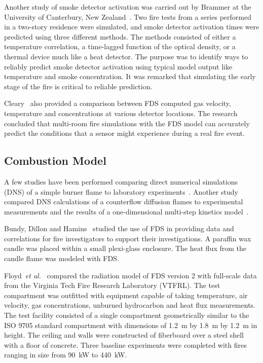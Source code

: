 Another study of smoke detector activation was carried out by Brammer at the University of Canterbury, New Zealand~\cite{Brammer:1}. Two fire tests from a series performed in a two-story residence were simulated, and smoke detector activation times were predicted using three different methods. The methods consisted of either a temperature correlation, a time-lagged function of the optical density, or a thermal device much like a heat detector. The purpose was to identify ways to reliably predict smoke detector activation using typical model output like temperature and smoke concentration. It was remarked that simulating the early stage of the fire is critical to reliable prediction.

Cleary~\cite{Cleary:1} also provided a comparison between FDS computed gas velocity, temperature and concentrations at various detector locations.  The research concluded that multi-room fire simulations with the FDS model can accurately predict the conditions that a sensor might experience during a real fire event.




\subsection{Combustion Model}

A few studies have been performed comparing direct numerical simulations (DNS) of a simple burner flame to laboratory experiments~\cite{Mukhopadhyay:1}. Another study compared DNS calculations of a counterflow diffusion flames to experimental measurements and the results of a one-dimensional multi-step kinetics model~\cite{Hamins:NASA}.

Bundy, Dillon and Hamins~\cite{Dillon:1,Hamins:FPE2005} studied the use of FDS in providing data and correlations for fire investigators to support their investigations.  A paraffin wax candle was placed within a small plexi-glass enclosure. The heat flux from the candle flame was modeled with FDS.

Floyd~{\em et al.}~\cite{Floyd:1,Floyd:6} compared the radiation model of FDS version 2 with full-scale data from the Virginia Tech Fire Research Laboratory (VTFRL). The test compartment was outfitted with equipment capable  of taking  temperature,  air velocity,  gas concentrations, unburned hydrocarbon and heat flux measurements. The test facility consisted of a single compartment geometrically similar to the ISO 9705 standard compartment with dimensions of 1.2~m by 1.8~m by 1.2~m in height.  The ceiling and walls were constructed of fiberboard over a steel shell with a floor of concrete.  Three baseline experiments were completed with fires ranging in size from 90~kW to 440~kW.

